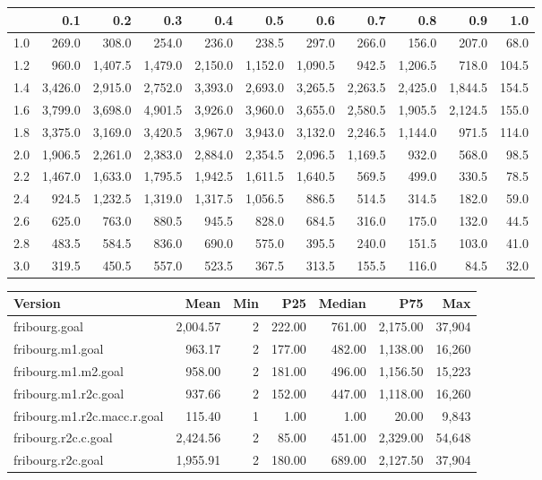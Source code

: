 \begin{tabular}{r|rrrrrrrrrr}
 & 0.1 & 0.2 & 0.3 & 0.4 & 0.5 & 0.6 & 0.7 & 0.8 & 0.9 & 1.0 \\ 
  \hline
1.0 & 269.0 & 308.0 & 254.0 & 236.0 & 238.5 & 297.0 & 266.0 & 156.0 & 207.0 & 68.0 \\ 
  1.2 & 960.0 & 1,407.5 & 1,479.0 & 2,150.0 & 1,152.0 & 1,090.5 & 942.5 & 1,206.5 & 718.0 & 104.5 \\ 
  1.4 & 3,426.0 & 2,915.0 & 2,752.0 & 3,393.0 & 2,693.0 & 3,265.5 & 2,263.5 & 2,425.0 & 1,844.5 & 154.5 \\ 
  1.6 & 3,799.0 & 3,698.0 & 4,901.5 & 3,926.0 & 3,960.0 & 3,655.0 & 2,580.5 & 1,905.5 & 2,124.5 & 155.0 \\ 
  1.8 & 3,375.0 & 3,169.0 & 3,420.5 & 3,967.0 & 3,943.0 & 3,132.0 & 2,246.5 & 1,144.0 & 971.5 & 114.0 \\ 
  2.0 & 1,906.5 & 2,261.0 & 2,383.0 & 2,884.0 & 2,354.5 & 2,096.5 & 1,169.5 & 932.0 & 568.0 & 98.5 \\ 
  2.2 & 1,467.0 & 1,633.0 & 1,795.5 & 1,942.5 & 1,611.5 & 1,640.5 & 569.5 & 499.0 & 330.5 & 78.5 \\ 
  2.4 & 924.5 & 1,232.5 & 1,319.0 & 1,317.5 & 1,056.5 & 886.5 & 514.5 & 314.5 & 182.0 & 59.0 \\ 
  2.6 & 625.0 & 763.0 & 880.5 & 945.5 & 828.0 & 684.5 & 316.0 & 175.0 & 132.0 & 44.5 \\ 
  2.8 & 483.5 & 584.5 & 836.0 & 690.0 & 575.0 & 395.5 & 240.0 & 151.5 & 103.0 & 41.0 \\ 
  3.0 & 319.5 & 450.5 & 557.0 & 523.5 & 367.5 & 313.5 & 155.5 & 116.0 & 84.5 & 32.0 \\ 
\end{tabular}

\begin{tabular}{lrrrrrr}
  \hline
Version & Mean & Min & P25 & Median & P75 & Max \\ 
  \hline
fribourg.goal & 2,004.57 & 2 & 222.00 & 761.00 & 2,175.00 & 37,904 \\ 
  fribourg.m1.goal & 963.17 & 2 & 177.00 & 482.00 & 1,138.00 & 16,260 \\ 
  fribourg.m1.m2.goal & 958.00 & 2 & 181.00 & 496.00 & 1,156.50 & 15,223 \\ 
  fribourg.m1.r2c.goal & 937.66 & 2 & 152.00 & 447.00 & 1,118.00 & 16,260 \\ 
  fribourg.m1.r2c.macc.r.goal & 115.40 & 1 & 1.00 & 1.00 & 20.00 & 9,843 \\ 
  fribourg.r2c.c.goal & 2,424.56 & 2 & 85.00 & 451.00 & 2,329.00 & 54,648 \\ 
  fribourg.r2c.goal & 1,955.91 & 2 & 180.00 & 689.00 & 2,127.50 & 37,904 \\ 
   \hline
\end{tabular}

